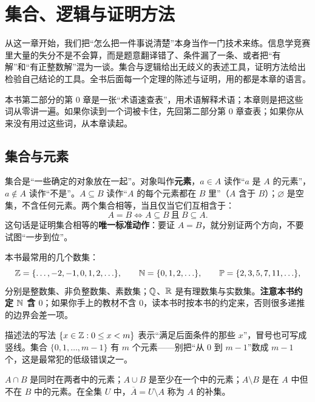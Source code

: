 
\chapter{集合、逻辑与证明方法}
\begin{chapterintro}[章节导读]
从这一章开始，我们把“怎么把一件事说清楚”本身当作一门技术来练。信息学竞赛里大量的失分不是不会算，而是题意翻译错了、条件漏了一条、或者把“有解”和“有正整数解”混为一谈。集合与逻辑给出无歧义的表述工具，证明方法给出检验自己结论的工具。全书后面每一个定理的陈述与证明，用的都是本章的语言。
\end{chapterintro}

\begin{tip}[这一章解决什么问题]
本书第二部分的第 0 章是一张“术语速查表”，用术语解释术语；本章则是把这些词从零讲一遍。如果你读到一个词被卡住，先回第二部分第 0 章查表；如果你从来没有用过这些词，从本章读起。
\end{tip}

\section{集合与元素}
集合是“一些确定的对象放在一起”。对象叫作\textbf{元素}，$a\in A$ 读作“$a$ 是 $A$ 的元素”，$a\notin A$ 读作“不是”。$A\subseteq B$ 读作“$A$ 的每个元素都在 $B$ 里”（$A$ 含于 $B$）；$\varnothing$ 是空集，不含任何元素。两个集合相等，当且仅当它们互相含于：
\[
A=B\iff A\subseteq B\ \text{且}\ B\subseteq A.
\]
这句话是证明集合相等的\textbf{唯一标准动作}：要证 $A=B$，就分别证两个方向，不要试图“一步到位”。

本书最常用的几个数集：
\[
\mathbb Z=\{\ldots,-2,-1,0,1,2,\ldots\},\qquad
\mathbb N=\{0,1,2,\ldots\},\qquad
\mathbb P=\{2,3,5,7,11,\ldots\},
\]
分别是整数集、非负整数集、素数集；$\mathbb Q$、$\mathbb R$ 是有理数集与实数集。\textbf{注意本书约定 $\mathbb N$ 含 $0$}；如果你手上的教材不含 $0$，读本书时按本书的约定来，否则很多递推的边界会差一项。

描述法的写法 $\{x\in\mathbb Z:0\le x<m\}$ 表示“满足后面条件的那些 $x$”，冒号也可写成竖线。集合 $\{0,1,\ldots,m-1\}$ 有 $m$ 个元素——别把“从 $0$ 到 $m-1$”数成 $m-1$ 个，这是最常犯的低级错误之一。

\begin{definition}[交、并、差、补]
$A\cap B$ 是同时在两者中的元素；$A\cup B$ 是至少在一个中的元素；$A\setminus B$ 是在 $A$ 中但不在 $B$ 中的元素。在全集 $U$ 中，$\overline A=U\setminus A$ 称为 $A$ 的补集。
\end{definition}

